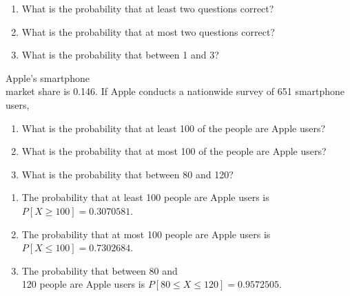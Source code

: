 \documentclass[11pt]{book}\usepackage[]{graphicx}\usepackage[]{color}
\begin{document}
\begin{exercises}
\begin{exercise}
\begin{enumerate}
\item What is the probability that at least two questions correct?
\item What is the probability that at most two questions correct?
\item What is the probability that between 1 and 3?
\end{enumerate}
	\end{exercise}
%
%

  \begin{exercise} %

Apple's smartphone \\ market  share is  0.146. If Apple conducts a nationwide survey of 651 smartphone \\ users,

\begin{enumerate}
\item What is the probability that at least 100 of the people are Apple users?
\item What is the probability that at most 100 of the people are Apple users?
\item What is the probability that between 80 and 120?
\end{enumerate}

	\end{exercise}
	\begin{solution}  %


\begin{enumerate}
\item The probability that at least 100 people are Apple users is $P[X \ge 100] = 0.3070581$.
\item The probability that at most 100 people are Apple users is $P[X \le 100] = 0.7302684$.
\item The probability that between 80 and \\ 120 people are Apple users is $P[ 80 \le X \le 120] = 0.9572505$.
\end{enumerate}
	\end{solution}


\end{exercises}
\end{document}
